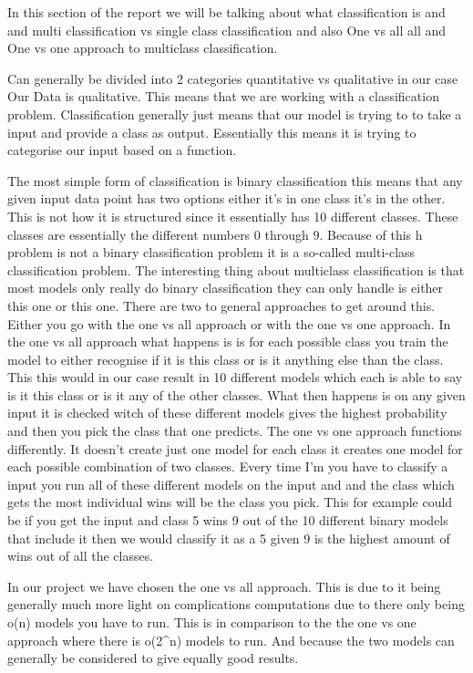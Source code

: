 In this section of the report we will be talking about what classification is and and multi classification vs single class classification and also One vs all all and One vs one approach to multiclass classification. 


Can generally be divided into 2 categories quantitative vs qualitative in our case Our Data is qualitative. This means that we are working with a classification problem.
Classification generally just means that our model is trying to to take a input and provide a class as output. Essentially this means it is trying to categorise our input based on a function.

The most simple form of classification is binary classification this means that any given input data point has two options either it's in one class it's in the other. This is not how it is structured since it essentially has 10 different classes. These classes are essentially the different numbers 0 through 9. Because of this h problem is not a binary classification problem it is a so-called multi-class classification problem.
The interesting thing about multiclass classification is that most models only really do binary classification they can only handle is either this one or this one. There are two to general approaches to get around this. Either you go with the one vs all approach or with the one vs one approach. In the one vs all approach what happens is is for each possible class you train the model to either recognise if it is this class or is it anything else than the class. This this would in our case result in 10 different models which each is able to say is it this class or is it any of the other classes. What then happens is on any given input it is checked witch of these different models gives the highest probability and then you pick the class that one predicts. The one vs one approach functions differently. It doesn't create just one model for each class it creates one model for each possible combination of two classes. Every time I'm you have to classify a input you run all of these different models on the input and and the class which gets the most individual wins will be the class you pick. This for example could be if you get the input and class 5 wins 9 out of the 10 different binary models that include it then we would classify it as a 5 given 9 is the highest amount of wins out of all the classes.\cite{James2013}

In our project we have chosen the one vs all approach. This is due to it being generally much more light on complications computations due to there only being o(n) models you have to run. This is in comparison to the the one vs one approach where there is o(2^n) models to run. And because the two models can generally be considered to give equally good results. \cite{rifkin2004defense}

